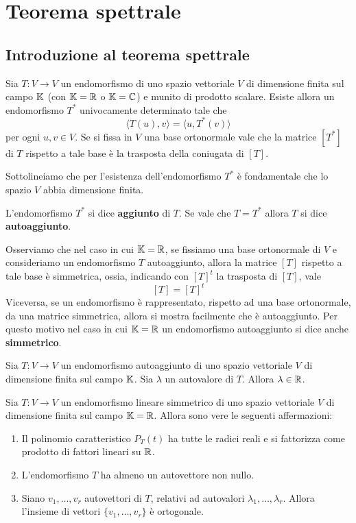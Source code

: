 \chapter{Teorema spettrale}
\section{Introduzione al teorema spettrale}

\begin{theorem}
	Sia $T : V \to V$ un endomorfismo di uno spazio vettoriale $V$ di dimensione
	finita sul campo $\mathbb{K}$ (con $\mathbb{K} = \mathbb{R}$ o
	$\mathbb{K} = \mathbb{C}$) e munito di prodotto scalare. Esiste allora un
	endomorfismo $T^*$ univocamente determinato tale che
	\[ \langle T(u), v \rangle = \langle u, T^*(v) \rangle \]
	per ogni $u, v \in V$. Se si fissa in $V$ una base ortonormale vale che la
	matrice $[T^*]$ di $T$ rispetto a tale base è la trasposta della coniugata
	di $[T]$.
\end{theorem}

Sottolineiamo che per l'esistenza dell'endomorfismo $T^*$ è fondamentale che
lo spazio $V$ abbia dimensione finita.

\begin{definition}
	L'endomorfismo $T^*$ si dice \textbf{aggiunto} di $T$. Se vale che $T = T^*$
	allora $T$ si dice \textbf{autoaggiunto}.
\end{definition}

Osserviamo che nel caso in cui $\mathbb{K} = \mathbb{R}$, se fissiamo una base
ortonormale di $V$ e consideriamo un endomorfismo $T$ autoaggiunto, allora la
matrice $[T]$ rispetto a tale base è simmetrica, ossia, indicando con $[T]^t$
la trasposta di $[T]$, vale
\[
	[T] = [T]^t
\]
Viceversa, se un endomorfismo è rappresentato, rispetto ad una base ortonormale,
da una matrice simmetrica, allora si mostra facilmente che è autoaggiunto.
Per questo motivo nel caso in cui $\mathbb{K} = \mathbb{R}$ un endomorfismo
autoaggiunto si dice anche \textbf{simmetrico}.

\begin{theorem}
	Sia $T : V \to V$ un endomorfismo autoaggiunto di uno spazio vettoriale $V$
	di dimensione finita sul campo $\mathbb{K}$. Sia $\lambda$ un autovalore di
	$T$. Allora $\lambda \in \mathbb{R}$.
\end{theorem}

\begin{theorem}
	Sia $T : V \to V$ un endomorfismo lineare simmetrico di uno spazio vettoriale
	$V$ di dimensione finita sul campo $\mathbb{K} = \mathbb{R}$. Allora sono vere
	le seguenti affermazioni:
	\begin{enumerate}
		\item Il polinomio caratteristico $P_T(t)$ ha tutte le radici reali e si
		      fattorizza come prodotto di fattori lineari su $\mathbb{R}$.
		\item L'endomorfismo $T$ ha almeno un autovettore non nullo.
		\item Siano $v_1, \dots, v_r$ autovettori di $T$, relativi ad autovalori
		      $\lambda_1, \dots, \lambda_r$. Allora l'insieme di vettori
		      $\{v_1, \dots, v_r\}$ è ortogonale.
	\end{enumerate}
\end{theorem}

